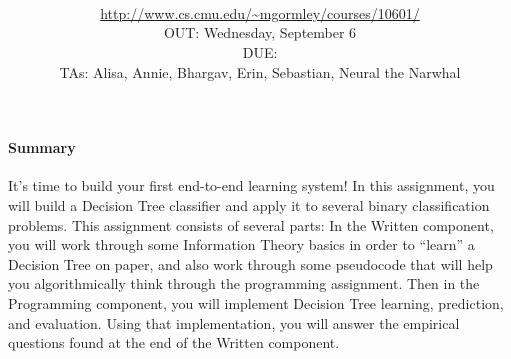 \documentclass[11pt,addpoints,answers]{exam}
\title{\textsc{\hwName}
} %
\author{\courseName\\
\url{http://www.cs.cmu.edu/~mgormley/courses/10601/} \\
OUT: Wednesday, September 6 \\
DUE: \dueDate{} \\ 
TAs: Alisa, Annie, Bhargav, Erin, Sebastian, Neural the Narwhal
}
\date{}
\date{}
\begin{document}
\maketitle

\vspace*{-6mm}
\begin{notebox}
\paragraph{Summary} It's time to build your first end-to-end learning system! In this assignment, you will build a Decision Tree classifier and apply it to several binary classification problems. This assignment consists of several parts: In the Written component, you will work through some Information Theory basics in order to ``learn'' a Decision Tree on paper, and also work through some pseudocode that will help you algorithmically think through the programming assignment. Then in the Programming component, you will implement Decision Tree learning, prediction, and evaluation. Using that implementation, you will answer the empirical questions found at the end of the Written component.
\end{notebox}
\vspace*{-5mm}\newcommand \maxsubs {10 }
\end{document}
